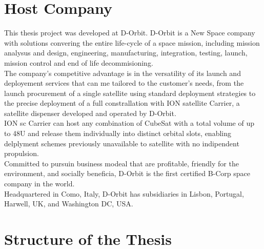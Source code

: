 \section{Host Company}
This thesis project was developed at D-Orbit.
D-Orbit is a New Space company with solutions convering the entire life-cycle of a space mission, including mission analysus and design, engineering, manufacturing, integration, testing, launch, mission control and end of life decommisioning.\\
The company's competitive advantage is in the versatility of its launch and deployement services that can me tailored to the customer's needs, from the launch procurement of a single satellite using standard deployment strategies to the precise deployment of a full constrallation with ION satellite Carrier, a satellite dispenser developed and operated by D-Orbit.\\
ION \acrshort{sc} Carrier can host any combination of CubeSat with a total volume of up to 48U and release them individually into distinct orbital slots, enabling delplyment schemes previously unavailable to satellite with no indipendent propulsion.\\
Committed to pursuin business modeal that are profitable, friendly for the environment, and socially beneficia, D-Orbit is the first certified B-Corp space company in the world.\\
Headquartered in Como, Italy, D-Orbit has subsidiaries in Lisbon, Portugal, Harwell, UK, and Washington DC, USA.\\

\section{Structure of the Thesis}
